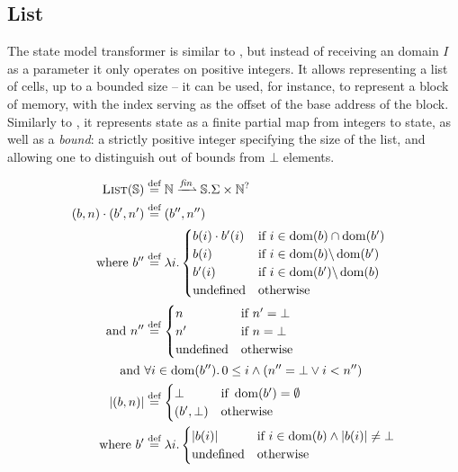 \subsection{List}

The \List{} state model transformer is similar to \PMap, but instead of receiving an domain $I$ as a parameter it only operates on positive integers. It allows representing a list of cells, up to a bounded size -- it can be used, for instance, to represent a block of memory, with the index serving as the offset of the base address of the block. Similarly to \PMap{}, it represents state as a finite partial map from integers to state, as well as a \emph{bound}: a strictly positive integer specifying the size of the list, and allowing one to distinguish out of bounds from $\bot$ elements.

\begin{align*}
	\List(\mmdl) &\defeq \nats \finmap \mmdl.\Sigma \times \nats^?\\
	(b,n)\cdot (b',n') &\defeq (b'', n'')\\
	\text{where } b''&\defeq \lambda i.\begin{cases}
		b(i)\cdot b'(i)&\If~i\in \dom(b)\cap\dom(b')\\
		b(i) &\If~i\in \dom(b) \backslash \dom(b')\\
		b'(i) &\If~i\in \dom(b') \backslash \dom(b)\\
		\text{undefined}&\Otherwise
	\end{cases}\\
	\text{and }n''&\defeq\begin{cases}
		n&\If~n'=\bot\\
		n'&\If~n=\bot\\
		\text{undefined}&\Otherwise
	\end{cases}\\
	\text{and }& \forall i\in\dom(b'')\ldotp 0\leq i \land (n'' = \bot \lor i < n'')\\
	|(b, n)| &\defeq \begin{cases}
		\bot &\If~\dom(b')=\emptyset\\
		(b',\bot) &\Otherwise
	\end{cases}\\
	\text{where }b'&\defeq\lambda i.\begin{cases}
		|b(i)| &\If~ i\in\dom(b) \land |b(i)| \neq \bot\\
		\text{undefined} &\Otherwise
	\end{cases}
\end{align*}

